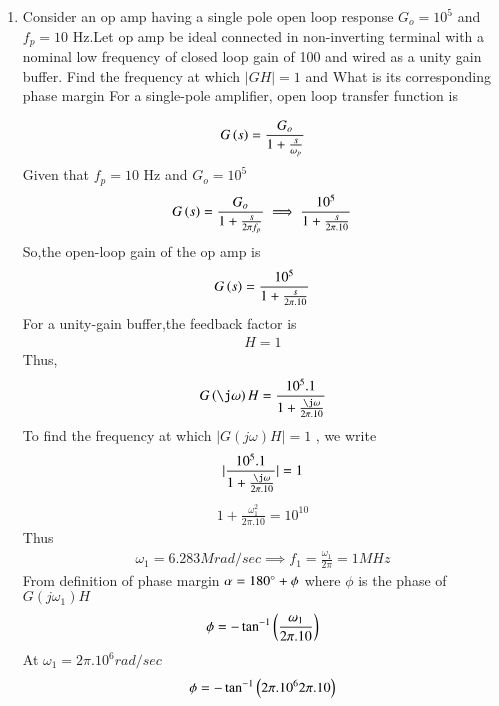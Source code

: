 \begin{enumerate}[label=\thesubsection.\arabic*.,ref=\thesubsection.\theenumi]

\item Consider an op amp having a single pole open loop response $G_{o} = 10^5$ and $f_{p} = 10$ Hz.Let op amp be ideal connected in non-inverting terminal with a nominal low frequency of closed loop gain of 100 and wired as a unity gain buffer.
\subitem Find the frequency at which $|GH| = 1$ and 
What is its corresponding phase margin
\solution  
For a single-pole amplifier, open loop transfer function is 

\begin{align}
    G\left(s\right) = \frac{G_{o}}{1+\frac{s}{\omega_{p}}}
\end{align}
Given that $f_{p} = 10$ Hz and $G_{o} =10^5$
\begin{align}
G\left(s\right)=\frac{G_{o}}{1+\frac{s}{2\pi f_{p}}}
\implies \frac{10^{5}}{1+\frac{s}{2\pi.10}}
\end{align}
So,the open-loop gain of the op amp is 
\begin{align}
    G\left(s\right)=\frac{10^{5}}{1+\frac{s}{2\pi.10}}
\end{align}
For a unity-gain buffer,the feedback factor is
\begin{align}
    H = 1
\end{align}
Thus, 
\begin{align}
    G\brak{\j\omega}H = \frac{10^{5}.1}{1+\frac{\j\omega}{2\pi.10}}
\end{align}
To find the frequency at which $|G(j\omega)H|=1$ , we write
\begin{align}
    |\frac{10^{5}.1}{1+\frac{\j\omega}{2\pi.10}}| = 1
\end{align}
\begin{align}
    {1+\frac{\omega_{1}^2}{2\pi.10}} = 10^{10}
\end{align}
Thus  
\begin{align}
    \omega_{1} = 6.283 Mrad/sec
\implies f_{1} =\frac{\omega_{1}}{2\pi}=1 MHz
\end{align}
From definition of phase margin $\alpha = 180\degree + \phi$
where $\phi$ is the phase of $G(j\omega_{1})H$
\begin{align}
\phi = -\tan^{-1}\brak{\frac{\omega_{1}}{2\pi.10}}
\label{eq:ee18btech11012_phaseGH}
\end{align}
At $\omega_{1} = 2\pi.10^{6}rad/sec$
\begin{align}
    \phi = -\tan^{-1}\brak{{2\pi.10^{6}}{2\pi.10}} \\

\end{align}
\end{enumerate}
